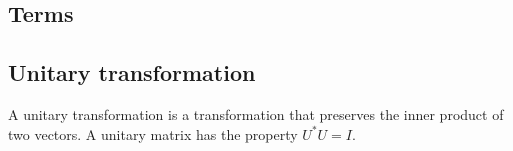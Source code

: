 \documentclass[a4paper,10pt, twocolumn]{article}
\begin{document}
\begin{appendices}
\section{Terms}
\subsection{Unitary transformation}
A unitary transformation is a transformation that preserves the inner product of two vectors. A unitary matrix has the property $U^*U = I$. 

\end{appendices}



\end{document}
